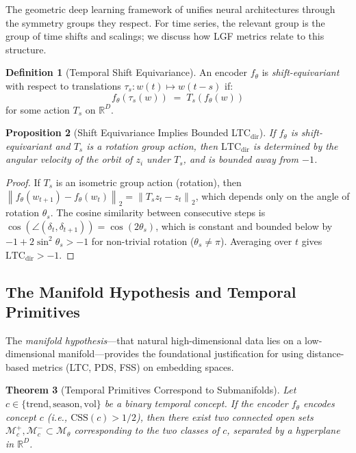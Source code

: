 \documentclass[12pt]{article}
\newtheorem{theorem}{Theorem}[section]
\newtheorem{proposition}[theorem]{Proposition}
\theoremstyle{definition}
\newtheorem{definition}[theorem]{Definition}
\theoremstyle{remark}
\newcommand{\R}{\mathbb{R}}
\newcommand{\Mset}{\mathcal{M}}
\newcommand{\norm}[1]{\left\lVert #1 \right\rVert}
\newcommand{\trm}{\mathcal{M}_\theta}
\newcommand{\ltcdir}{\mathrm{LTC}_{\mathrm{dir}}}
\newcommand{\css}{\mathrm{CSS}}
\begin{document}
The geometric deep learning framework of \citet{bronstein2021geometric}
unifies neural architectures through the symmetry groups they respect.
For time series, the relevant group is the group of time shifts and
scalings; we discuss how LGF metrics relate to this structure.

\begin{definition}[Temporal Shift Equivariance]
An encoder $f_\theta$ is \emph{shift-equivariant} with respect to
translations $\tau_s: w(t) \mapsto w(t-s)$ if:
\[
  f_\theta(\tau_s(w)) \;=\; T_s(f_\theta(w))
\]
for some action $T_s$ on $\R^D$.
\end{definition}

\begin{proposition}[Shift Equivariance Implies Bounded LTC$_{\mathrm{dir}}$]
\label{prop:equivariance_ltcdir}
If $f_\theta$ is shift-equivariant and $T_s$ is a rotation group action,
then $\ltcdir$ is determined by the angular velocity of the orbit of $z_i$
under $T_s$, and is bounded away from $-1$.
\end{proposition}

\begin{proof}
If $T_s$ is an isometric group action (rotation), then
$\norm{f_\theta(w_{t+1}) - f_\theta(w_t)}_2 = \norm{T_s z_t - z_t}_2$,
which depends only on the angle of rotation $\theta_s$. The cosine
similarity between consecutive steps is
$\cos(\angle(\delta_t, \delta_{t+1})) = \cos(2\theta_s)$,
which is constant and bounded below by $-1 + 2\sin^2\theta_s > -1$
for non-trivial rotation ($\theta_s \neq \pi$). Averaging over $t$ gives
$\ltcdir > -1$.
\end{proof}

\subsection{The Manifold Hypothesis and Temporal Primitives}

The \emph{manifold hypothesis}---that natural high-dimensional data lies on
a low-dimensional manifold---provides the foundational justification for
using distance-based metrics (LTC, PDS, FSS) on embedding spaces.

\begin{theorem}[Temporal Primitives Correspond to Submanifolds]
\label{thm:submanifolds}
Let $c \in \{\mathrm{trend}, \mathrm{season}, \mathrm{vol}\}$ be a binary
temporal concept. If the encoder $f_\theta$ encodes concept $c$
(i.e., $\css(c) > 1/2$), then there exist two connected open sets
$\Mset^+_c, \Mset^-_c \subset \trm$ corresponding to the two classes of $c$,
separated by a hyperplane in $\R^D$.
\end{theorem}
\end{document}
